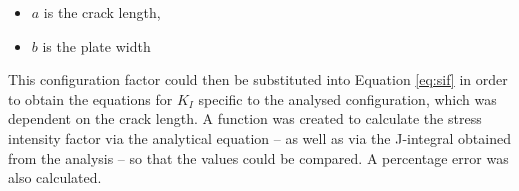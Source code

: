 \begin{itemize}
	\item $a$ is the crack length,
	\item $b$ is the plate width
\end{itemize}

This configuration factor could then be substituted into Equation \ref{eq:sif} in order to obtain the equations for $K_I$ specific to the analysed configuration, which was dependent on the crack length. A function was created to calculate the stress intensity factor via the analytical equation -- as well as via the J-integral obtained from the analysis -- so that the values could be compared. A percentage error was also calculated.






